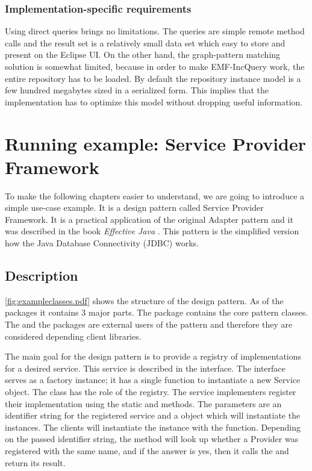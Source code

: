 \subsubsection{Implementation-specific requirements}
Using direct queries brings no limitations. The queries are simple remote method
calls and the result set is a relatively small data set which easy to store and
present on the Eclipse UI. On the other hand, the graph-pattern matching
solution is somewhat limited, because in order to make EMF-IncQuery work,
the entire repository has to be loaded. By default the repository instance model
is a few hundred megabytes sized in a serialized form. This implies that the
implementation has to optimize this model without dropping useful information.

\section{Running example: Service Provider Framework}\label{sect:spf}

To make the following chapters easier to understand, we are going to introduce a
simple use-case example. It is a design pattern called Service Provider
Framework. It is a practical application of the original Adapter pattern and it
was described in the book \emph{Effective Java} \cite{Bloch08}. This pattern
is the simplified version how the Java Database Connectivity (JDBC) works.


\subsection{Description}\label{sect:spfdesc}



\autoref{fig:exampleclasses.pdf} shows the structure of the design pattern. As of
the packages it contains 3 major parts.
The  package contains the core pattern classes. The 
and the  packages are external users of the pattern and therefore
they are considered depending client libraries.

The main goal for the design pattern is to provide a registry of implementations
for a desired service. This service is described in the 
interface. The  interface serves as a factory instance; it has
a single function to instantiate a new Service object. The  class
has the role of the registry.
The service implementers register their implementation using the static
 and  methods. The
parameters are an identifier string for the registered service and a 
object which will instantiate the  instances. The clients will
instantiate the  instance with the  function.
Depending on the passed identifier string, the method will look up whether a Provider
was registered with the same name, and if the answer is yes, then it calls the
 and return its result.

